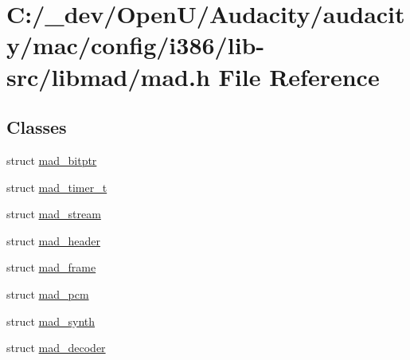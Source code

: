 \hypertarget{mac_2config_2i386_2lib-src_2libmad_2mad_8h}{}\section{C\+:/\+\_\+dev/\+Open\+U/\+Audacity/audacity/mac/config/i386/lib-\/src/libmad/mad.h File Reference}
\label{mac_2config_2i386_2lib-src_2libmad_2mad_8h}
\subsection*{Classes}
\begin{DoxyCompactItemize}
\item 
struct \hyperlink{structmad__bitptr}{mad\+\_\+bitptr}
\item 
struct \hyperlink{structmad__timer__t}{mad\+\_\+timer\+\_\+t}
\item 
struct \hyperlink{structmad__stream}{mad\+\_\+stream}
\item 
struct \hyperlink{structmad__header}{mad\+\_\+header}
\item 
struct \hyperlink{structmad__frame}{mad\+\_\+frame}
\item 
struct \hyperlink{structmad__pcm}{mad\+\_\+pcm}
\item 
struct \hyperlink{structmad__synth}{mad\+\_\+synth}
\item 
struct \hyperlink{structmad__decoder}{mad\+\_\+decoder}
\end{DoxyCompactItemize}
